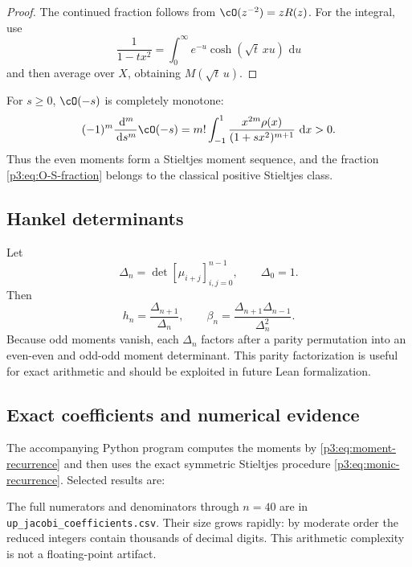 \documentclass[11pt,oneside]{article}
\theoremstyle{definition}
\newcommand{\dd}{\,\mathrm d}
\begin{document}
\begin{proof}
The continued fraction follows from \(\cO(z^{-2})=zR(z)\).  For the integral, use
\[
 \frac1{1-tx^2}=\int_0^{\infty}e^{-u}\cosh(\sqrt t\,xu)\,\dd u
\]
and then average over \(X\), obtaining \(M(\sqrt t\,u)\).
\end{proof}

For \(s\ge0\), \(\cO(-s)\) is completely monotone:
\begin{equation}
 (-1)^m\frac{\dd^m}{\dd s^m}\cO(-s)
 =m!\int_{-1}^{1}\frac{x^{2m}\rho(x)}{(1+sx^2)^{m+1}}\,\dd x>0. \label{p3:eq:O-complete-monotone}
\end{equation}
Thus the even moments form a Stieltjes moment sequence, and the fraction
\eqref{p3:eq:O-S-fraction} belongs to the classical positive Stieltjes class.

\subsection{Hankel determinants}

Let
\begin{equation}
 \Delta_n=\det[\mu_{i+j}]_{i,j=0}^{n-1},\qquad \Delta_0=1.  \label{p3:eq:Hankel}
\end{equation}
Then
\begin{equation}
 h_n=\frac{\Delta_{n+1}}{\Delta_n},
 \qquad
 \boxed{\beta_n=\frac{\Delta_{n+1}\Delta_{n-1}}{\Delta_n^2}}. \label{p3:eq:beta-Hankel}
\end{equation}
Because odd moments vanish, each \(\Delta_n\) factors after a parity permutation into an
even-even and odd-odd moment determinant.  This parity factorization is useful for exact
arithmetic and should be exploited in future Lean formalization.

\subsection{Exact coefficients and numerical evidence}

The accompanying Python program computes the moments by
\eqref{p3:eq:moment-recurrence} and then uses the exact symmetric Stieltjes procedure
\eqref{p3:eq:monic-recurrence}.  Selected results are:

\begin{center}

\end{center}

The full numerators and denominators through \(n=40\) are in
\texttt{up\_jacobi\_coefficients.csv}.  Their size grows rapidly: by moderate order the
reduced integers contain thousands of decimal digits.  This arithmetic complexity is not a
floating-point artifact.
\end{document}
